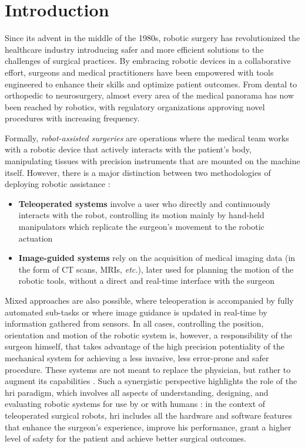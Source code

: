 \documentclass[../main.tex]{subfiles}
\begin{document}
\section{Introduction}
Since its advent in the middle of the 1980s, robotic surgery has revolutionized the healthcare industry introducing safer and more efficient solutions to the challenges of surgical practices. By embracing robotic devices in a collaborative effort, surgeons and medical practitioners have been empowered with tools engineered to enhance their skills and optimize patient outcomes. 
From dental to orthopedic to neurosurgery, almost every area of the medical panorama has now been reached by robotics, with regulatory organizations approving novel procedures with increasing frequency.

Formally, \textit{robot-assisted surgeries} are operations where the medical team works with a robotic device that actively interacts with the patient's body, manipulating tissues with precision instruments that are mounted on the machine itself. 
However, there is a major distinction between two methodologies of deploying robotic assistance \cite{Hoeckelmann2015}:
\begin{itemize}
    \item \textbf{Teleoperated systems} involve a user who directly and continuously interacts with the robot, controlling its motion mainly by hand-held manipulators which replicate the surgeon's movement to the robotic actuation
    \item \textbf{Image-guided systems} rely on the acquisition of medical imaging data (in the form of CT scans, MRIs, \textit{etc.}), later used for planning the motion of the robotic tools, without a direct and real-time interface with the surgeon
\end{itemize}
Mixed approaches are also possible, where teleoperation is accompanied by fully automated sub-tasks or where image guidance is updated in real-time by information gathered from sensors. 
In all cases, controlling the position, orientation and motion of the robotic system is, however, a responsibility of the surgeon himself, that takes advantage of the high precision potentiality of the mechanical system for achieving a less invasive, less error-prone and safer procedure. These systems are not meant to replace the physician, but rather to augment its capabilities \cite{Cleary2001}. Such a synergistic perspective highlights the role of the \ac{hri} paradigm, which involves all aspects of understanding, designing, and evaluating robotic systems for use by or with humans \cite{Goodrich2007}: in the context of teleoperated surgical robots, \ac{hri} includes all the hardware and software features that enhance the surgeon's experience, improve his performance, grant a higher level of safety for the patient and achieve better surgical outcomes.
\end{document}
